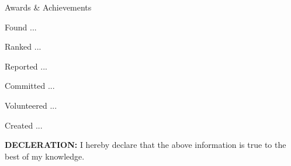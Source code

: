 \documentclass{customize} %
\begin{document}
\begin{rSection}{Awards \& Achievements}

\begin{rSubsection}{}{}{}{}
\item Found ...
\item Ranked ...
\item Reported ...
\item Committed ...
\item Volunteered ...
\item Created ...
\end{rSubsection}
\end{rSection}

\vfill

\textbf{DECLERATION:} I hereby declare that the above information is true to the best of my knowledge.
\end{document}
